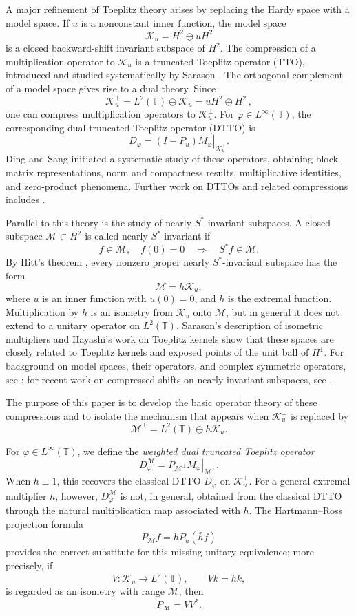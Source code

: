 \documentclass[12pt]{amsart}
\theoremstyle{definition}
\theoremstyle{remark}
\def \T{\mathbb{T}}
\newcommand{\clm}{\mathcal{M}}
\newcommand{\clk}{\mathcal{K}}
\newcommand{\vp}{\varphi}
\newcommand\restr[2]{\ensuremath{\left.#1\right|_{#2}}}
\numberwithin{equation}{section}
\begin{document}
A major refinement of Toeplitz theory arises by replacing the Hardy space with a model space. If $u$ is a nonconstant inner function, the model space
\[
\clk_u=H^2\ominus uH^2
\]
is a closed backward-shift invariant subspace of $H^2$. The compression of a multiplication operator to $\clk_u$ is a truncated Toeplitz operator (TTO), introduced and studied systematically by Sarason \cite{Sarason2007}. The orthogonal complement of a model space gives rise to a dual theory. Since
\[
\clk_u^\perp=L^2(\T)\ominus\clk_u=uH^2\oplus H^2_{-},
\]
one can compress multiplication operators to $\clk_u^\perp$. For $\vp\in L^\infty(\T)$, the corresponding dual truncated Toeplitz operator (DTTO) is
\[
D_\vp=\restr{(I-P_u)M_\vp}{\clk_u^\perp}.
\]
Ding and Sang \cite{Sang:Ding} initiated a systematic study of these operators, obtaining block matrix representations, norm and compactness results, multiplicative identities, and zero-product phenomena. Further work on DTTOs and related compressions includes \cite{Bhuia:Nag, Bhuia:Ramesh:Nag, Camara:Ptak, Camara:Klis:Ptak:2020, Camara:Klis:Ptak:2022, Camara-Ross, Gu, HuEtAl2018, LiSangDing2020, Sang:Qin:Ding:2019, Sang:Qin:Ding, Wang:Zhao:Zheng, Zhu:Wu:Chen:2025}.

Parallel to this theory is the study of nearly $S^*$-invariant subspaces. A closed subspace $\clm\subset H^2$ is called nearly $S^*$-invariant if
\[
f\in\clm,\quad f(0)=0 \quad\Longrightarrow\quad S^*f\in\clm .
\]
By Hitt's theorem \cite{Hitt1988}, every nonzero proper nearly $S^*$-invariant subspace has the form
\[
\clm=h\clk_u,
\]
where $u$ is an inner function with $u(0)=0$, and $h$ is the extremal function. Multiplication by $h$ is an isometry from $\clk_u$ onto $\clm$, but in general it does not extend to a unitary operator on $L^2(\T)$. Sarason's description of isometric multipliers \cite{Sarason1987} and
Hayashi's work on Toeplitz kernels \cite{Hayashi1990} show that these spaces are closely related to Toeplitz kernels and exposed points of the unit ball of $H^1$. For background on model spaces, their operators, and complex symmetric operators, see \cite{GRM, Garcia:Putinar, NF}; for recent work on compressed shifts on nearly invariant subspaces, see \cite{LiangPartington2026}.

The purpose of this paper is to develop the basic operator theory of these compressions and to isolate the mechanism that appears when $\clk_u^\perp$ is replaced by
\[
\clm^\perp=L^2(\T)\ominus h\clk_u.
\]

For $\vp\in L^\infty(\T)$, we define the \emph{weighted dual truncated Toeplitz operator}
\[
D_\vp^\clm=\restr{P_{\clm^\perp}M_\vp}{\clm^\perp}.
\]
When $h\equiv1$, this recovers the classical DTTO $D_\vp$ on $\clk_u^\perp$. For a general extremal multiplier $h$, however, $D_\vp^\clm$ is not, in general, obtained from the classical DTTO through the natural multiplication map associated with $h$. The Hartmann--Ross projection formula
\[
P_\clm f=hP_u(\bar h f)
\]
provides the correct substitute for this missing unitary equivalence; more precisely, if
\[
V:\clk_u\to L^2(\T),\qquad Vk=hk,
\]
is regarded as an isometry with range $\clm$, then
\[
P_\clm=VV^*.
\]
\end{document}
